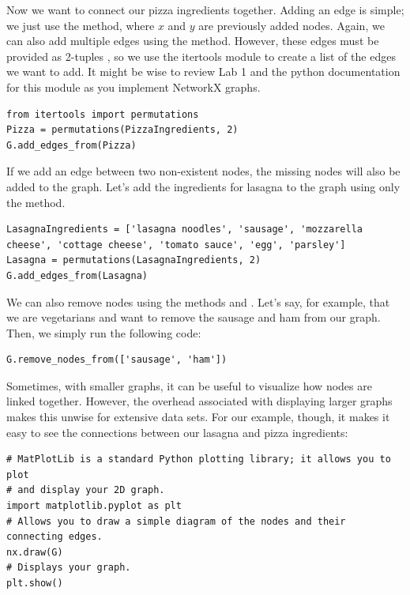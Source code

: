 Now we want to connect our pizza ingredients together. Adding an edge is simple; we just use the  method, where $x$ and $y$ are previously added nodes.
Again, we can also add multiple edges using the  method. 
However, these edges must be provided as 2-tuples , so we use the 
itertools module to create a list of the edges we want to add. It might be wise
to review Lab 1 and the python documentation for this module as you implement
NetworkX graphs.

\begin{lstlisting}
from itertools import permutations
Pizza = permutations(PizzaIngredients, 2)
G.add_edges_from(Pizza)
\end{lstlisting}
If we add an edge between two non-existent nodes, the missing nodes will also be added to the graph. Let's add the ingredients for lasagna to the graph using only the  method.
\begin{lstlisting}
LasagnaIngredients = ['lasagna noodles', 'sausage', 'mozzarella cheese', 'cottage cheese', 'tomato sauce', 'egg', 'parsley']
Lasagna = permutations(LasagnaIngredients, 2)
G.add_edges_from(Lasagna)
\end{lstlisting}
We can also remove nodes using the methods  and . 
Let's say, for example, that we are vegetarians and want to remove the 
sausage and ham from our graph. Then, we simply run the following code:
\begin{lstlisting}
G.remove_nodes_from(['sausage', 'ham'])
\end{lstlisting}

Sometimes, with smaller graphs, it can be useful to visualize how nodes are linked together. However, the overhead associated with displaying larger graphs makes this unwise for extensive data sets.
For our example, though, it makes it easy to see the connections between our lasagna and pizza ingredients:

\begin{lstlisting}
# MatPlotLib is a standard Python plotting library; it allows you to plot
# and display your 2D graph.
import matplotlib.pyplot as plt
# Allows you to draw a simple diagram of the nodes and their connecting edges.
nx.draw(G)
# Displays your graph.
plt.show()
\end{lstlisting}



